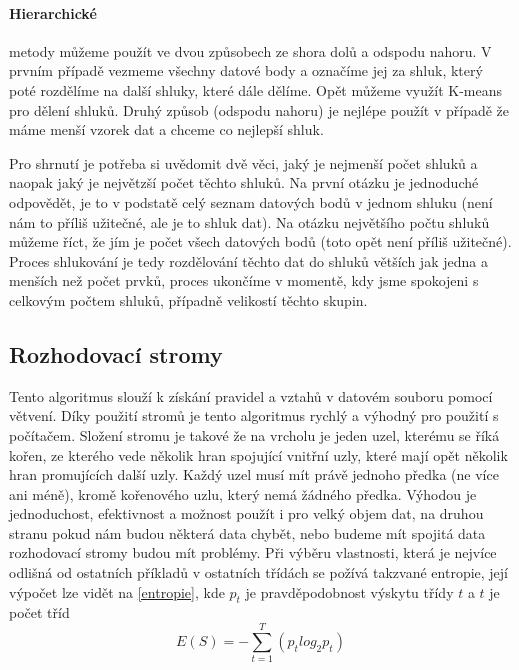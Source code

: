 \paragraph{Hierarchické} metody můžeme použít ve dvou způsobech ze shora dolů a odspodu nahoru. V prvním případě vezmeme všechny datové body a označíme jej za shluk, který poté rozdělíme na další shluky, které dále dělíme. Opět můžeme využít K-means pro dělení shluků. Druhý způsob (odspodu nahoru) je nejlépe použít v případě že máme menší vzorek dat a chceme co nejlepší shluk.

\par Pro shrnutí je potřeba si uvědomit dvě věci, jaký je nejmenší počet shluků a naopak jaký je největzší počet těchto shluků. Na první otázku je jednoduché odpovědět, je to v podstatě celý seznam datových bodů v jednom shluku (není nám to příliš užitečné, ale je to shluk dat). Na otázku největšího počtu shluků můžeme říct, že jím je počet všech datových bodů (toto opět není příliš užitečné). Proces shlukování je tedy rozdělování těchto dat do shluků větších jak jedna a menších než počet prvků, proces ukončíme v momentě, kdy jsme spokojeni s celkovým počtem shluků, případně velikostí těchto skupin.

\subsection{Rozhodovací stromy}
\par Tento algoritmus slouží k získání pravidel a vztahů v datovém souboru pomocí větvení. Díky použití stromů je tento algoritmus rychlý a výhodný pro použití s počítačem. Složení stromu je takové že na vrcholu je jeden uzel, kterému se říká kořen, ze kterého vede několik hran spojující vnitřní uzly, které mají opět několik hran promujících další uzly. Každý uzel musí mít právě jednoho předka (ne více ani méně), kromě kořenového uzlu, který nemá žádného předka. Výhodou je jednoduchost, efektivnost a možnost použít i pro velký objem dat, na druhou stranu pokud nám budou některá data chybět, nebo budeme mít spojitá data rozhodovací stromy budou mít problémy. Při výběru vlastnosti, která je nejvíce odlišná od ostatních příkladů v ostatních třídách se požívá takzvané entropie, její výpočet lze vidět na \ref{entropie}, kde \(p_t\) je pravděpodobnost výskytu třídy \(t\) a \(t\) je počet tříd
\begin{equation} \label{entropie}
E(S) = - \sum_{t=1}^{T}(p_t log_2 p_t)
\end{equation}

